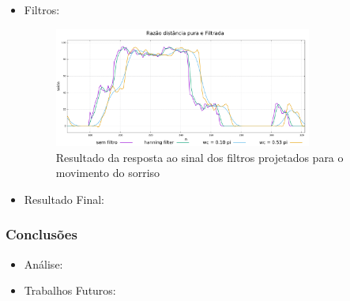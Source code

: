 \documentclass[brazil]{beamer}
\begin{document}
\begin{frame}
  \begin{itemize}
      \item Filtros:
	\begin{figure}
        \centering
        \includegraphics[width = 0.8\textwidth, keepaspectratio]{./img/filter-result-smile.pdf}
        \caption{Resultado da resposta ao sinal dos filtros projetados para o movimento do sorriso}
      \end{figure}
              
  \end{itemize} 
\end{frame}



\begin{frame}
  \begin{itemize}
      \item Resultado Final:
              
  \end{itemize} 
\end{frame}


\begin{frame}
\frametitle{Conclusões}
  \begin{itemize}
      \item Análise:
      
      \item Trabalhos Futuros:
              
  \end{itemize} 
\end{frame}
\end{document}
